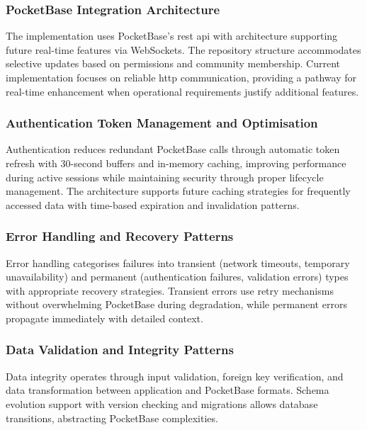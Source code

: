 \subsubsection{PocketBase Integration Architecture}

The implementation uses PocketBase's \ac{rest} \ac{api} with architecture supporting future real-time features via WebSockets. The repository structure accommodates selective updates based on permissions and community membership. Current implementation focuses on reliable \ac{http} communication, providing a pathway for real-time enhancement when operational requirements justify additional features.

\subsubsection{Authentication Token Management and Optimisation}

Authentication reduces redundant PocketBase calls through automatic token refresh with 30-second buffers and in-memory caching, improving performance during active sessions while maintaining security through proper lifecycle management. The architecture supports future caching strategies for frequently accessed data with time-based expiration and invalidation patterns.

\subsubsection{Error Handling and Recovery Patterns}

Error handling categorises failures into transient (network timeouts, temporary unavailability) and permanent (authentication failures, validation errors) types with appropriate recovery strategies. Transient errors use retry mechanisms without overwhelming PocketBase during degradation, while permanent errors propagate immediately with detailed context.

\subsubsection{Data Validation and Integrity Patterns}

Data integrity operates through input validation, foreign key verification, and data transformation between application and PocketBase formats. Schema evolution support with version checking and migrations allows database transitions, abstracting PocketBase complexities.


